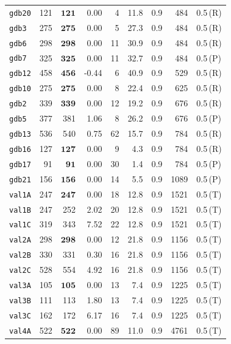 \begin{longtable}{lrrrrrrrl}
\texttt{gdb20} & 121 & $\mathbf{121}$ & 0.00 & 4 & 11.8 & 0.9 & 484 & 0.5\,(R) \\
\texttt{gdb3} & 275 & $\mathbf{275}$ & 0.00 & 5 & 27.3 & 0.9 & 484 & 0.5\,(R) \\
\texttt{gdb6} & 298 & $\mathbf{298}$ & 0.00 & 11 & 30.9 & 0.9 & 484 & 0.5\,(R) \\
\texttt{gdb7} & 325 & $\mathbf{325}$ & 0.00 & 11 & 32.7 & 0.9 & 484 & 0.5\,(P) \\
\texttt{gdb12} & 458 & $\mathbf{456}$ & -0.44 & 6 & 40.9 & 0.9 & 529 & 0.5\,(R) \\
\texttt{gdb10} & 275 & $\mathbf{275}$ & 0.00 & 8 & 22.4 & 0.9 & 625 & 0.5\,(R) \\
\texttt{gdb2} & 339 & $\mathbf{339}$ & 0.00 & 12 & 19.2 & 0.9 & 676 & 0.5\,(R) \\
\texttt{gdb5} & 377 & 381 & 1.06 & 8 & 26.2 & 0.9 & 676 & 0.5\,(P) \\
\texttt{gdb13} & 536 & 540 & 0.75 & 62 & 15.7 & 0.9 & 784 & 0.5\,(R) \\
\texttt{gdb16} & 127 & $\mathbf{127}$ & 0.00 & 9 & 4.3 & 0.9 & 784 & 0.5\,(R) \\
\texttt{gdb17} & 91 & $\mathbf{91}$ & 0.00 & 30 & 1.4 & 0.9 & 784 & 0.5\,(P) \\
\texttt{gdb21} & 156 & $\mathbf{156}$ & 0.00 & 14 & 5.5 & 0.9 & 1089 & 0.5\,(P) \\
\texttt{val1A} & 247 & $\mathbf{247}$ & 0.00 & 18 & 12.8 & 0.9 & 1521 & 0.5\,(T) \\
\texttt{val1B} & 247 & 252 & 2.02 & 20 & 12.8 & 0.9 & 1521 & 0.5\,(T) \\
\texttt{val1C} & 319 & 343 & 7.52 & 22 & 12.8 & 0.9 & 1521 & 0.5\,(T) \\
\texttt{val2A} & 298 & $\mathbf{298}$ & 0.00 & 12 & 21.8 & 0.9 & 1156 & 0.5\,(T) \\
\texttt{val2B} & 330 & 331 & 0.30 & 16 & 21.8 & 0.9 & 1156 & 0.5\,(T) \\
\texttt{val2C} & 528 & 554 & 4.92 & 16 & 21.8 & 0.9 & 1156 & 0.5\,(T) \\
\texttt{val3A} & 105 & $\mathbf{105}$ & 0.00 & 13 & 7.4 & 0.9 & 1225 & 0.5\,(T) \\
\texttt{val3B} & 111 & 113 & 1.80 & 13 & 7.4 & 0.9 & 1225 & 0.5\,(T) \\
\texttt{val3C} & 162 & 172 & 6.17 & 16 & 7.4 & 0.9 & 1225 & 0.5\,(T) \\
\texttt{val4A} & 522 & $\mathbf{522}$ & 0.00 & 89 & 11.0 & 0.9 & 4761 & 0.5\,(T) \\

\end{longtable}
